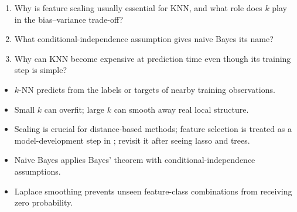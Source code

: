 

\begin{quickcheck}
\begin{enumerate}
  \item Why is feature scaling usually essential for KNN, and what role does \(k\) play in the bias--variance trade-off?
  \item What conditional-independence assumption gives naive Bayes its name?
  \item Why can KNN become expensive at prediction time even though its training step is simple?
\end{enumerate}
\end{quickcheck}

\begin{chapterrecap}
\begin{itemize}
  \item $k$-NN predicts from the labels or targets of nearby training observations.
  \item Small $k$ can overfit; large $k$ can smooth away real local structure.
  \item Scaling is crucial for distance-based methods; feature selection is treated as a model-development step in ; revisit it after seeing lasso and trees.
  \item Naive Bayes applies Bayes' theorem with conditional-independence assumptions.
  \item Laplace smoothing prevents unseen feature-class combinations from receiving zero probability.
\end{itemize}
\end{chapterrecap}
